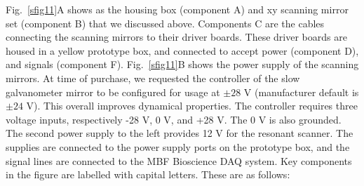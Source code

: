 \documentclass[10pt,letterpaper]{article}
\begin{document}
Fig.~\ref{sfig11}A shows as the housing box (component A) and xy scanning mirror set (component B) that we discussed above. Components C are the cables connecting the scanning mirrors to their driver boards. These driver boards are housed in a yellow prototype box, and connected to accept power (component D), and signals (component F). Fig.~\ref{sfig11}B shows the power supply of the scanning mirrors. At time of purchase, we requested the controller of the slow galvanometer mirror to be configured for usage at $\pm 28\text{ V}$  (manufacturer default is $\pm 24\text{ V}$). This overall improves dynamical properties. The controller requires three voltage inputs, respectively -28 V, 0 V, and +28 V. The 0 V is also grounded. The second power supply to the left provides 12 V for the resonant scanner. The supplies are connected to the power supply ports on the prototype box, and the signal lines are connected to the MBF Bioscience DAQ system. Key components in the figure are labelled with capital letters. These are as follows:
\end{document}
